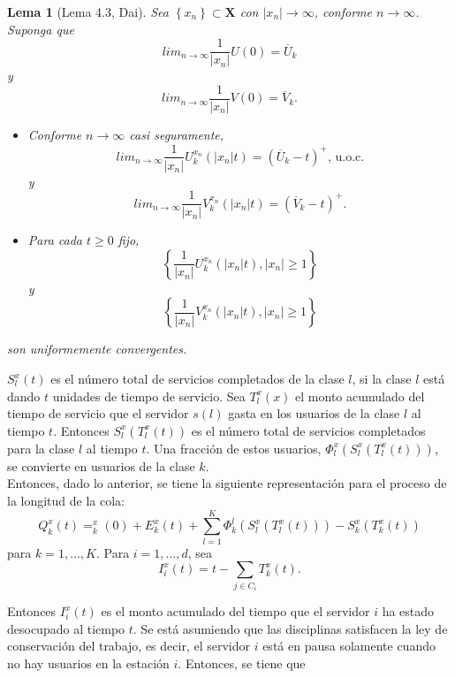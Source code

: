 \documentclass{article}
\newtheorem{Lema}{Lema}[section]
\numberwithin{equation}{section}
\begin{document}
\begin{Lema}[Lema 4.3, Dai\cite{Dai}]\label{Lema.4.3}
Sea $\left\{x_{n}\right\}\subset \mathbf{X}$ con
$|x_{n}|\rightarrow\infty$, conforme $n\rightarrow\infty$. Suponga
que
\[lim_{n\rightarrow\infty}\frac{1}{|x_{n}|}U\left(0\right)=\overline{U}_{k}\]
y
\[lim_{n\rightarrow\infty}\frac{1}{|x_{n}|}V\left(0\right)=\overline{V}_{k}.\]
\begin{itemize}
\item[a)] Conforme $n\rightarrow\infty$ casi seguramente,
\[lim_{n\rightarrow\infty}\frac{1}{|x_{n}|}U^{x_{n}}_{k}\left(|x_{n}|t\right)=\left(\overline{U}_{k}-t\right)^{+}\textrm{, u.o.c.}\]
y
\[lim_{n\rightarrow\infty}\frac{1}{|x_{n}|}V^{x_{n}}_{k}\left(|x_{n}|t\right)=\left(\overline{V}_{k}-t\right)^{+}.\]

\item[b)] Para cada $t\geq0$ fijo,
\[\left\{\frac{1}{|x_{n}|}U^{x_{n}}_{k}\left(|x_{n}|t\right),|x_{n}|\geq1\right\}\]
y
\[\left\{\frac{1}{|x_{n}|}V^{x_{n}}_{k}\left(|x_{n}|t\right),|x_{n}|\geq1\right\}\]
\end{itemize}
son uniformemente convergentes.
\end{Lema}

$S_{l}^{x}\left(t\right)$ es el n\'umero total de servicios
completados de la clase $l$, si la clase $l$ est\'a dando $t$
unidades de tiempo de servicio. Sea $T_{l}^{x}\left(x\right)$ el
monto acumulado del tiempo de servicio que el servidor
$s\left(l\right)$ gasta en los usuarios de la clase $l$ al tiempo
$t$. Entonces $S_{l}^{x}\left(T_{l}^{x}\left(t\right)\right)$ es
el n\'umero total de servicios completados para la clase $l$ al
tiempo $t$. Una fracci\'on de estos usuarios,
$\Phi_{l}^{x}\left(S_{l}^{x}\left(T_{l}^{x}\left(t\right)\right)\right)$,
se convierte en usuarios de la clase $k$.\\

Entonces, dado lo anterior, se tiene la siguiente representaci\'on
para el proceso de la longitud de la cola:\\

\begin{equation}
Q_{k}^{x}\left(t\right)=_{k}^{x}\left(0\right)+E_{k}^{x}\left(t\right)+\sum_{l=1}^{K}\Phi_{k}^{l}\left(S_{l}^{x}\left(T_{l}^{x}\left(t\right)\right)\right)-S_{k}^{x}\left(T_{k}^{x}\left(t\right)\right)
\end{equation}
para $k=1,\ldots,K$. Para $i=1,\ldots,d$, sea
\[I_{i}^{x}\left(t\right)=t-\sum_{j\in C_{i}}T_{k}^{x}\left(t\right).\]

Entonces $I_{i}^{x}\left(t\right)$ es el monto acumulado del
tiempo que el servidor $i$ ha estado desocupado al tiempo $t$. Se
est\'a asumiendo que las disciplinas satisfacen la ley de
conservaci\'on del trabajo, es decir, el servidor $i$ est\'a en
pausa solamente cuando no hay usuarios en la estaci\'on $i$.
Entonces, se tiene que
\end{document}
